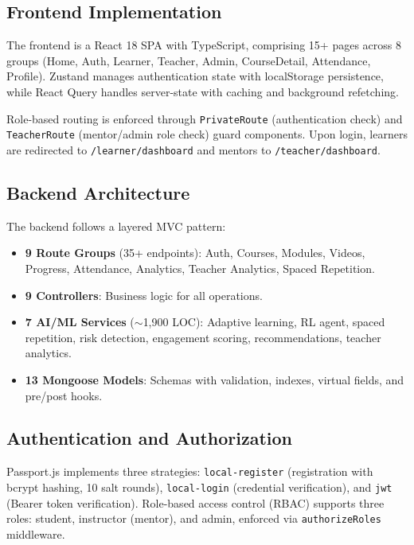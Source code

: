 \documentclass[conference]{IEEEtran}
\begin{document}
\subsection{Frontend Implementation}

The frontend is a React 18 SPA with TypeScript, comprising 15+ pages across 8 groups (Home, Auth, Learner, Teacher, Admin, CourseDetail, Attendance, Profile). Zustand manages authentication state with localStorage persistence, while React Query handles server-state with caching and background refetching.

Role-based routing is enforced through \texttt{PrivateRoute} (authentication check) and \texttt{TeacherRoute} (mentor/admin role check) guard components. Upon login, learners are redirected to \texttt{/learner/dashboard} and mentors to \texttt{/teacher/dashboard}.

\subsection{Backend Architecture}

The backend follows a layered MVC pattern:
\begin{itemize}
    \item \textbf{9 Route Groups} (35+ endpoints): Auth, Courses, Modules, Videos, Progress, Attendance, Analytics, Teacher Analytics, Spaced Repetition.
    \item \textbf{9 Controllers}: Business logic for all operations.
    \item \textbf{7 AI/ML Services} ($\sim$1,900 LOC): Adaptive learning, RL agent, spaced repetition, risk detection, engagement scoring, recommendations, teacher analytics.
    \item \textbf{13 Mongoose Models}: Schemas with validation, indexes, virtual fields, and pre/post hooks.
\end{itemize}

\subsection{Authentication and Authorization}

Passport.js implements three strategies: \texttt{local-register} (registration with bcrypt hashing, 10 salt rounds), \texttt{local-login} (credential verification), and \texttt{jwt} (Bearer token verification). Role-based access control (RBAC) supports three roles: student, instructor (mentor), and admin, enforced via \texttt{authorizeRoles} middleware.
\end{document}
